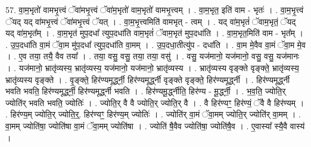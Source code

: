 \documentclass[17pt]{extarticle}
\begin{document}
57. वा॒म॒भृतो॑ वामभृ॒त्त्वं ॅवा॑मभृ॒त्त्वं ॅवा॑म॒भृतो॑ वाम॒भृतो॑ वामभृ॒त्त्वम् । . वा॒म॒भृत॒ इति॑ वाम - भृतः॑ । . वा॒म॒भृ॒त्त्वं ॅयद् यद् वा॑मभृ॒त्त्वं ॅवा॑मभृ॒त्त्वं ॅयत् । . वा॒म॒भृ॒त्त्वमिति॑ वामभृत् - त्वम् । . यद् वा॑म॒भृतं॑ ॅवाम॒भृतं॒ ॅयद् यद् वा॑म॒भृत᳚म् । . वा॒म॒भृत॑ मुप॒दधा᳚ त्युप॒दधा॑ति वाम॒भृतं॑ ॅवाम॒भृत॑ मुप॒दधा॑ति । . वा॒म॒भृत॒मिति॑ वाम - भृत᳚म् । . उ॒प॒दधा॑ति वा॒मं ॅवा॒म मु॑प॒दधा᳚ त्युप॒दधा॑ति वा॒मम् । . उ॒प॒दधा॒तीत्यु॑प - दधा॑ति । . वा॒म मे॒वैव वा॒मं ॅवा॒म मे॒व । . ए॒व तया॒ तयै॒ वैव तया᳚ । . तया॒ वसु॒ वसु॒ तया॒ तया॒ वसु॑ । . वसु॒ यज॑मानो॒ यज॑मानो॒ वसु॒ वसु॒ यज॑मानः । . यज॑मानो॒ भ्रातृ॑व्यस्य॒ भ्रातृ॑व्यस्य॒ यज॑मानो॒ यज॑मानो॒ भ्रातृ॑व्यस्य । . भ्रातृ॑व्यस्य वृङ्क्ते वृङ्क्ते॒ भ्रातृ॑व्यस्य॒ भ्रातृ॑व्यस्य वृङ्क्ते । . वृ॒ङ्क्ते॒ हिर॑ण्यमूर्द्ध्नी॒ हिर॑ण्यमूर्द्ध्नी वृङ्क्ते वृङ्क्ते॒ हिर॑ण्यमूर्द्ध्नी । . हिर॑ण्यमूर्द्ध्नी भवति भवति॒ हिर॑ण्यमूर्द्ध्नी॒ हिर॑ण्यमूर्द्ध्नी भवति । . हिर॑ण्यमू॒र्द्ध्नीति॒ हिर॑ण्य - मू॒र्द्ध्नी॒ । . भ॒व॒ति॒ ज्योति॒र् ज्योति॑र् भवति भवति॒ ज्योतिः॑ । . ज्योति॒र् वै वै ज्योति॒र् ज्योति॒र् वै । . वै हिर॑ण्यꣳ॒॒ हिर॑ण्यं॒ ॅवै वै हिर॑ण्यम् । . हिर॑ण्य॒म् ज्योति॒र् ज्योति॒र्॒. हिर॑ण्यꣳ॒॒ हिर॑ण्य॒म् ज्योतिः॑ । . ज्योति॑र् वा॒मं ॅवा॒मम् ज्योति॒र् ज्योति॑र् वा॒मम् । . वा॒मम् ज्योति॑षा॒ ज्योति॑षा वा॒मं ॅवा॒मम् ज्योति॑षा । . ज्योति॑ षै॒वैव ज्योति॑षा॒ ज्योति॑षै॒व । . ए॒वास्या᳚ स्यै॒वै वास्य॑ । \newline
\end{document}
